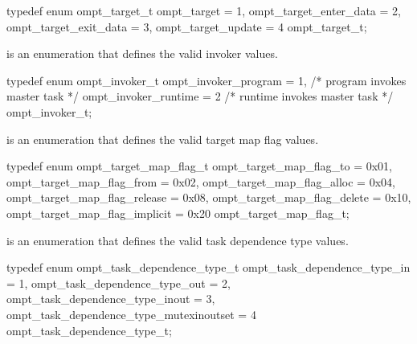 \begin{ccppspecific}
\begin{omptEnum}
typedef enum ompt_target_t {
  ompt_target                         = 1,
  ompt_target_enter_data              = 2,
  ompt_target_exit_data               = 3,
  ompt_target_update                  = 4
} ompt_target_t;
\end{omptEnum}
\end{ccppspecific}





\label{sec:ompt_invoker_t}
 is an enumeration that defines the valid invoker values.


\begin{ccppspecific}
\begin{omptEnum}
typedef enum ompt_invoker_t {
  ompt_invoker_program = 1, /* program invokes master task */
  ompt_invoker_runtime = 2  /* runtime invokes master task */
} ompt_invoker_t;
\end{omptEnum}
\end{ccppspecific}





\label{sec:ompt_target_map_flag_t}
 is an enumeration that defines the valid target map flag values.


\begin{ccppspecific}
\begin{omptEnum}
typedef enum ompt_target_map_flag_t {
  ompt_target_map_flag_to             = 0x01,
  ompt_target_map_flag_from           = 0x02,
  ompt_target_map_flag_alloc          = 0x04,
  ompt_target_map_flag_release        = 0x08,
  ompt_target_map_flag_delete         = 0x10,
  ompt_target_map_flag_implicit       = 0x20
} ompt_target_map_flag_t;
\end{omptEnum}
\end{ccppspecific}





\label{sec:ompt_task_dependence_type_t}
 is an enumeration that defines the valid task dependence type values.


\begin{ccppspecific}
\begin{omptEnum}
typedef enum ompt_task_dependence_type_t {
  ompt_task_dependence_type_in              = 1,
  ompt_task_dependence_type_out             = 2,
  ompt_task_dependence_type_inout           = 3,
  ompt_task_dependence_type_mutexinoutset   = 4
} ompt_task_dependence_type_t;
\end{omptEnum}
\end{ccppspecific}





